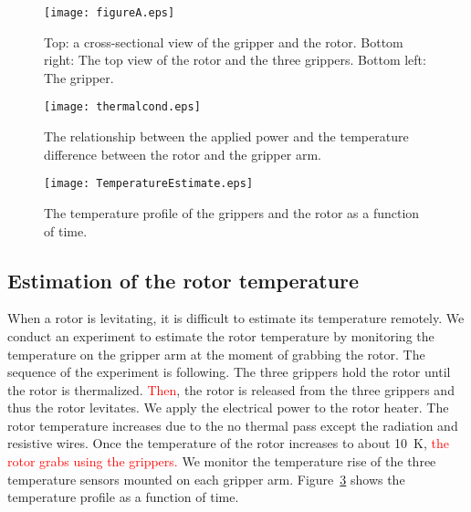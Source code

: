 \documentclass[journal]{IEEEtran}
\def\cred{\textcolor{red}}
\begin{document}

\begin{figure}[htb]
   \centering
   \texttt{[image: figureA.eps]} %
   \caption{Top: a cross-sectional view of the gripper and the rotor. Bottom right: The top view of the rotor and the three grippers. Bottom left: The gripper.}
   \label{fig:figureA}
\end{figure}

\begin{figure}[htb]
   \centering
   \texttt{[image: thermalcond.eps]} %
   \caption{The relationship between the applied power and the temperature difference between the rotor and the gripper arm. }
   \label{fig:thermalcond}
\end{figure}

\begin{figure}[htb]
   \centering
   \texttt{[image: TemperatureEstimate.eps]} %
   \caption{The temperature profile of the grippers and the rotor as a function of time. }
   \label{fig:TemperatureEstimate}
\end{figure}

\subsection{Estimation of the rotor temperature}
When a rotor is levitating, it is difficult to estimate its temperature remotely.
We conduct an experiment to estimate the rotor temperature by monitoring the temperature on the gripper arm at the moment of grabbing the rotor.
The sequence of the experiment is following.
The three grippers hold the rotor until the rotor is thermalized.
\cred{Then}, the rotor is released from the three grippers and thus the rotor levitates.
We apply the electrical power to the rotor heater.
The rotor temperature increases due to the no thermal pass except the radiation and resistive wires.
Once the temperature of the rotor increases to about 10~K, \cred{the rotor grabs using the grippers.}
We monitor the temperature rise of the three temperature sensors mounted on each gripper arm.
Figure~\ref{fig:TemperatureEstimate} shows the temperature profile as a function of time.
\end{document}
